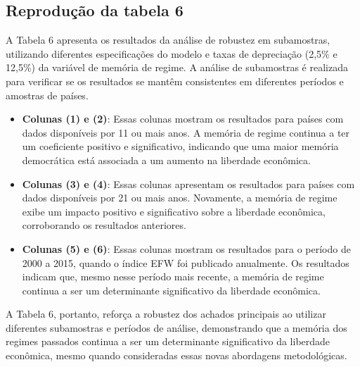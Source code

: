 	\subsection{Reprodução da tabela 6}


A Tabela 6 apresenta os resultados da análise de robustez em subamostras, utilizando diferentes especificações do modelo e taxas de depreciação (2,5\% e 12,5\%) da variável de memória de regime. A análise de subamostras é realizada para verificar se os resultados se mantêm consistentes em diferentes períodos e amostras de países.

\begin{itemize}
    \item \textbf{Colunas (1) e (2)}: Essas colunas mostram os resultados para países com dados disponíveis por 11 ou mais anos. A memória de regime continua a ter um coeficiente positivo e significativo, indicando que uma maior memória democrática está associada a um aumento na liberdade econômica.
    \item \textbf{Colunas (3) e (4)}: Essas colunas apresentam os resultados para países com dados disponíveis por 21 ou mais anos. Novamente, a memória de regime exibe um impacto positivo e significativo sobre a liberdade econômica, corroborando os resultados anteriores.
    \item \textbf{Colunas (5) e (6)}: Essas colunas mostram os resultados para o período de 2000 a 2015, quando o índice EFW foi publicado anualmente. Os resultados indicam que, mesmo nesse período mais recente, a memória de regime continua a ser um determinante significativo da liberdade econômica.
\end{itemize}

A Tabela 6, portanto, reforça a robustez dos achados principais ao utilizar diferentes subamostras e períodos de análise, demonstrando que a memória dos regimes passados continua a ser um determinante significativo da liberdade econômica, mesmo quando consideradas essas novas abordagens metodológicas.


